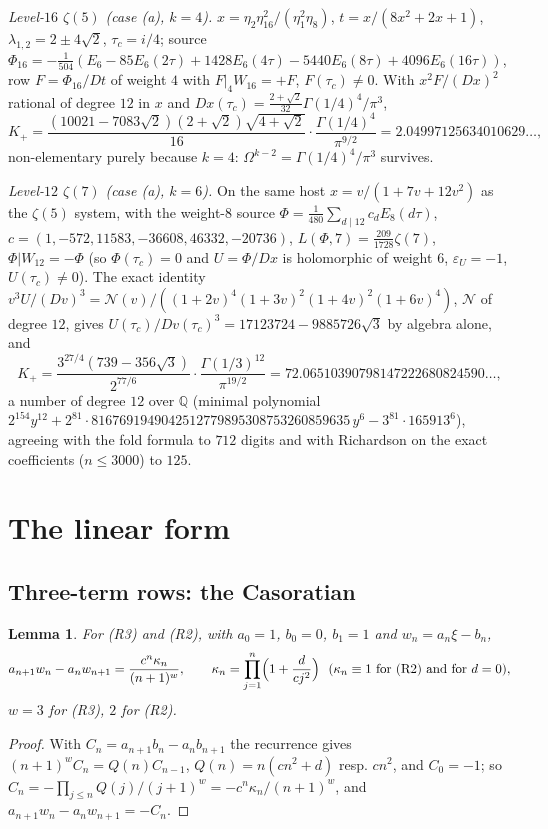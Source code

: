 \documentclass[11pt]{amsart}
\newtheorem{lemma}[theorem]{Lemma}
\theoremstyle{definition}
\theoremstyle{remark}
\newcommand{\Q}{\mathbb Q}\newcommand{\Z}{\mathbb Z}\newcommand{\R}{\mathbb R}\newcommand{\C}{\mathbb C}\newcommand{\HH}{\mathbb H}
\begin{document}
\emph{Level-$16$ $\zeta(5)$ (case (a), $k=4$).} $x=\eta_2\eta_{16}^2/(\eta_1^2\eta_8)$, $t=x/(8x^2+2x+1)$, $\lambda_{1,2}=2\pm4\sqrt2$, $\tau_c=i/4$; source $\Phi_{16}=-\frac1{504}(E_6-85E_6(2\tau)+1428E_6(4\tau)-5440E_6(8\tau)+4096E_6(16\tau))$, row $F=\Phi_{16}/Dt$ of weight $4$ with $F|_4W_{16}=+F$, $F(\tau_c)\ne0$. With $x^2F/(Dx)^2$ rational of degree $12$ in $x$ and $Dx(\tau_c)=\frac{2+\sqrt2}{32}\Gamma(1/4)^4/\pi^3$,
$$K_+=\frac{(10021-7083\sqrt2)(2+\sqrt2)\sqrt{4+\sqrt2}}{16}\cdot\frac{\Gamma(1/4)^4}{\pi^{9/2}}=2.04997125634010629\ldots,$$
non-elementary purely because $k=4$: $\Omega^{k-2}=\Gamma(1/4)^4/\pi^3$ survives.

\emph{Level-$12$ $\zeta(7)$ (case (a), $k=6$).} On the same host $x=v/(1+7v+12v^2)$ as the $\zeta(5)$ system, with the weight-$8$ source $\Phi=\frac1{480}\sum_{d\mid12}c_dE_8(d\tau)$, $c=(1,-572,11583,-36608,46332,-20736)$, $L(\Phi,7)=\frac{209}{1728}\zeta(7)$, $\Phi|W_{12}=-\Phi$ (so $\Phi(\tau_c)=0$ and $U=\Phi/Dx$ is holomorphic of weight $6$, $\varepsilon_U=-1$, $U(\tau_c)\ne0$). The exact identity $v^3U/(Dv)^3=\mathcal N(v)/((1+2v)^4(1+3v)^2(1+4v)^2(1+6v)^4)$, $\mathcal N$ of degree $12$, gives $U(\tau_c)/Dv(\tau_c)^3=17123724-9885726\sqrt3$ by algebra alone, and
$$K_+=\frac{3^{27/4}(739-356\sqrt3)}{2^{77/6}}\cdot\frac{\Gamma(1/3)^{12}}{\pi^{19/2}}=72.06510390798147222680824590\ldots,$$
a number of degree $12$ over $\Q$ (minimal polynomial $2^{154}y^{12}+2^{81}\cdot8167691949042512779895308753260859635\,y^6-3^{81}\cdot165913^6$), agreeing with the fold formula to $712$ digits and with Richardson on the exact coefficients ($n\le3000$) to $125$.

\section{The linear form}\label{sec:form}

\subsection{Three-term rows: the Casoratian}
\begin{lemma}\label{lem:cas}
For (R3) and (R2), with $a_0=1$, $b_0=0$, $b_1=1$ and $w_n=a_n\xi-b_n$,
$$a_{n+1}w_n-a_nw_{n+1}=\frac{c^n\kappa_n}{(n+1)^w},\qquad \kappa_n=\prod_{j=1}^n\Bigl(1+\frac d{cj^2}\Bigr)\ \ (\kappa_n\equiv1\text{ for (R2) and for }d=0),$$
$w=3$ for (R3), $2$ for (R2).
\end{lemma}
\begin{proof}
With $C_n=a_{n+1}b_n-a_nb_{n+1}$ the recurrence gives $(n+1)^wC_n=Q(n)C_{n-1}$, $Q(n)=n(cn^2+d)$ resp. $cn^2$, and $C_0=-1$; so $C_n=-\prod_{j\le n}Q(j)/(j+1)^w=-c^n\kappa_n/(n+1)^w$, and $a_{n+1}w_n-a_nw_{n+1}=-C_n$.
\end{proof}
\end{document}
